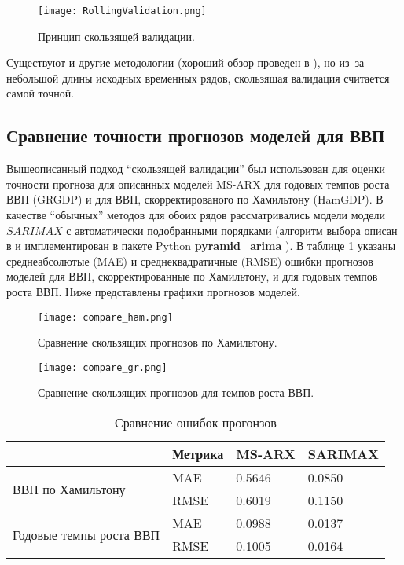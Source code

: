 \documentclass[a4paper,14pt]{extreport}
\begin{document}
	\begin{figure}
		\texttt{[image: RollingValidation.png]}
		\caption{Принцип скользящей валидации.}
		\label{fig:rolling_validation}
	\end{figure}
	
	Существуют и другие методологии (хороший обзор проведен в \cite{hyndCV}), но из--за небольшой длины исходных временных рядов, скользящая валидация считается самой точной.
	
	
	\subsection{Сравнение точности прогнозов моделей для ВВП}
	
	Вышеописанный подход ``скользящей валидации'' был использован для оценки точности прогноза для описанных моделей MS-ARX для годовых темпов роста ВВП (GRGDP) и для ВВП, скорректированого по Хамильтону (HamGDP). В качестве ``обычных'' методов для обоих рядов рассматривались модели модели $SARIMAX$ с автоматически подобранными порядками (алгоритм выбора описан в \cite{hynd_autoarima} и имплементирован в пакете Python \textbf{pyramid\_arima} \cite{pyramid_arima}). В таблице \ref{tbl:errors} указаны среднеабсолютые (MAE) и среднеквадратичные (RMSE) ошибки прогнозов моделей для ВВП, скорректированные по Хамильтону, и для годовых темпов роста ВВП. Ниже представлены графики прогнозов моделей.
	
	\begin{figure}
		\texttt{[image: compare\_ham.png]}
		\caption{Сравнение скользящих прогнозов по Хамильтону.}
		\label{fig:rollcompare-ham}
	\end{figure}
	
	\begin{figure}
		\texttt{[image: compare\_gr.png]}
		\caption{Сравнение скользящих прогнозов для темпов роста ВВП.}
		\label{fig:rollcompare-tr}
	\end{figure}
	
	\begin{table}[]
		\centering
		\caption{Сравнение ошибок прогонзов}
		\begin{tabular}{l|l|ll|}
			\cline{2-4}
			& Метрика & MS-ARX & SARIMAX \\ \hline
			\multicolumn{1}{|l|}{\multirow{2}{*}{ВВП по Хамильтону}}       & MAE     & 0.5646 & 0.0850  \\
			\multicolumn{1}{|l|}{}                                         & RMSE    & 0.6019 & 0.1150  \\ \hline
			\multicolumn{1}{|l|}{\multirow{2}{*}{Годовые темпы роста ВВП}} & MAE     & 0.0988 & 0.0137  \\
			\multicolumn{1}{|l|}{}                                         & RMSE    & 0.1005 & 0.0164  \\ \hline
		\end{tabular}
		\label{tbl:errors}
	\end{table}
	
\end{document}
